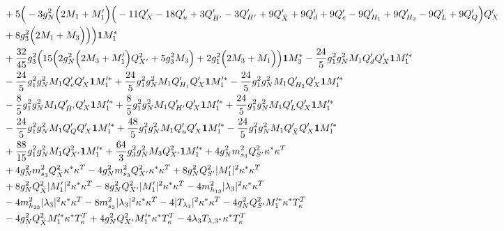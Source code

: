 {\begin{align}
 &+5 \Big(-3 g_{N}^{2} \Big(2 M_1  + M_1'\Big)\Big(-11 Q_X'  -18 Q_u'  + 3 Q_{\bar{H}'}'  -3 Q_{H'}'  + 9 Q_{\bar{X}}'  + 9 Q_d'  + 9 Q_e'  -9 Q_{H_1}'  + 9 Q_{H_2}'  -9 Q_L'  + 9 Q_Q' \Big)Q_X'  \nonumber\\
&+ 8 g_{3}^{2} \Big(2 M_1  + M_3\Big)\Big)\Big){\bf 1} M_1^* \nonumber \\ 
 &+\frac{32}{45} g_{3}^{2} \Big(15 \Big(2 g_{N}^{2} \Big(2 M_3  + M_1'\Big)Q_{X'}^{2}  + 5 g_{3}^{2} M_3 \Big) + 2 g_{1}^{2} \Big(2 M_3  + M_1\Big)\Big){\bf 1} M_3^* -\frac{24}{5} g_{1}^{2} g_{N}^{2} M_1 Q_d' Q_X' {\bf 1} M_1'^* \nonumber \\ 
 &-\frac{24}{5} g_{1}^{2} g_{N}^{2} M_1 Q_e' Q_X' {\bf 1} M_1'^* +\frac{24}{5} g_{1}^{2} g_{N}^{2} M_1 Q_{H_1}' Q_X' {\bf 1} M_1'^* -\frac{24}{5} g_{1}^{2} g_{N}^{2} M_1 Q_{H_2}' Q_X' {\bf 1} M_1'^* \nonumber \\ 
 &-\frac{8}{5} g_{1}^{2} g_{N}^{2} M_1 Q_{\bar{H}'}' Q_X' {\bf 1} M_1'^* +\frac{8}{5} g_{1}^{2} g_{N}^{2} M_1 Q_{H'}' Q_X' {\bf 1} M_1'^* +\frac{24}{5} g_{1}^{2} g_{N}^{2} M_1 Q_L' Q_X' {\bf 1} M_1'^* \nonumber \\ 
 &-\frac{24}{5} g_{1}^{2} g_{N}^{2} M_1 Q_Q' Q_X' {\bf 1} M_1'^* +\frac{48}{5} g_{1}^{2} g_{N}^{2} M_1 Q_u' Q_X' {\bf 1} M_1'^* -\frac{24}{5} g_{1}^{2} g_{N}^{2} M_1 Q_{\bar{X}}' Q_X' {\bf 1} M_1'^* \nonumber \\ 
 &+\frac{88}{15} g_{1}^{2} g_{N}^{2} M_1 Q_{X'}^{2} {\bf 1} M_1'^* +\frac{64}{3} g_{3}^{2} g_{N}^{2} M_3 Q_{X'}^{2} {\bf 1} M_1'^* +4 g_{N}^{2} m_{s_3}^2 Q_{S'}^{2} {\kappa^*  \kappa^{T}} \nonumber \\ 
 &+4 g_{N}^{2} m_{s_3}^2 Q_{\bar{X}}^{2} {\kappa^*  \kappa^{T}} -4 g_{N}^{2} m_{s_3}^2 Q_{X'}^{2} {\kappa^*  \kappa^{T}} +8 g_{N}^{2} Q_{S'}^{2} |M_1'|^2 {\kappa^*  \kappa^{T}} \nonumber \\ 
 &+8 g_{N}^{2} Q_{\bar{X}}^{2} |M_1'|^2 {\kappa^*  \kappa^{T}} -8 g_{N}^{2} Q_{X'}^{2} |M_1'|^2 {\kappa^*  \kappa^{T}} -4 m_{h_{13}}^2 |\lambda_3|^2 {\kappa^*  \kappa^{T}} \nonumber \\ 
 &-4 m_{h_{23}}^2 |\lambda_3|^2 {\kappa^*  \kappa^{T}} -8 m_{s_3}^2 |\lambda_3|^2 {\kappa^*  \kappa^{T}} -4 |T_{\lambda_3}|^2 {\kappa^*  \kappa^{T}} -4 g_{N}^{2} Q_{S'}^{2} M_1'^* {\kappa^*  T_{\kappa}^{T}} \nonumber \\ 
 &-4 g_{N}^{2} Q_{\bar{X}}^{2} M_1'^* {\kappa^*  T_{\kappa}^{T}} +4 g_{N}^{2} Q_{X'}^{2} M_1'^* {\kappa^*  T_{\kappa}^{T}} -4 \lambda_3 T_{{\lambda,3}^*} {\kappa^*  T_{\kappa}^{T}} \nonumber \\ 

\end{align}}
